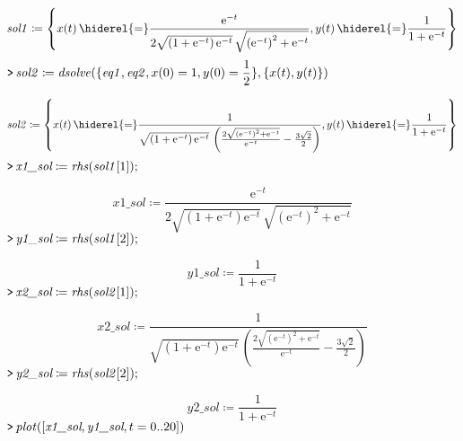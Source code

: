 \documentclass{article}
\begin{document}
\begin{dmath}\label{(14)}
\mathit{sol1} \coloneqq \left\{x \! \left(t \right) \hiderel{=} \frac{{\mathrm e}^{-t}}{2 \sqrt{\left(1+{\mathrm e}^{-t}\right) {\mathrm e}^{-t}}\, \sqrt{\left({\mathrm e}^{-t}\right)^{2}+{\mathrm e}^{-t}}},y \! \left(t \right) \hiderel{=} \frac{1}{1+{\mathrm e}^{-t}}\right\}
\end{dmath}
\mapleinput
{$ \displaystyle \texttt{>\,} \mathit{sol2} \coloneqq \mathit{dsolve} (\{\mathit{eq1} ,\mathit{eq2} ,x (0)=1,y (0)=\frac{1}{2}\},\{x (t),y (t)\}) $}

\begin{dmath}\label{(15)}
\mathit{sol2} \coloneqq \left\{x \! \left(t \right) \hiderel{=} \frac{1}{\sqrt{\left(1+{\mathrm e}^{-t}\right) {\mathrm e}^{-t}}\, \left(\frac{2 \sqrt{\left({\mathrm e}^{-t}\right)^{2}+{\mathrm e}^{-t}}}{{\mathrm e}^{-t}}-\frac{3 \sqrt{2}}{2}\right)},y \! \left(t \right) \hiderel{=} \frac{1}{1+{\mathrm e}^{-t}}\right\}
\end{dmath}
\mapleinput
{$ \displaystyle \texttt{>\,} \textit{x1\_sol} \coloneqq \mathit{rhs} (\mathit{sol1} [1]); $}

\begin{dmath}\label{(16)}
\textit{x1\_sol} \coloneqq \frac{{\mathrm e}^{-t}}{2 \sqrt{\left(1+{\mathrm e}^{-t}\right) {\mathrm e}^{-t}}\, \sqrt{\left({\mathrm e}^{-t}\right)^{2}+{\mathrm e}^{-t}}}
\end{dmath}
\mapleinput
{$ \displaystyle \texttt{>\,} \textit{y1\_sol} \coloneqq \mathit{rhs} (\mathit{sol1} [2]); $}

\begin{dmath}\label{(17)}
\textit{y1\_sol} \coloneqq \frac{1}{1+{\mathrm e}^{-t}}
\end{dmath}
\mapleinput
{$ \displaystyle \texttt{>\,} \textit{x2\_sol} \coloneqq \mathit{rhs} (\mathit{sol2} [1]); $}

\begin{dmath}\label{(18)}
\textit{x2\_sol} \coloneqq \frac{1}{\sqrt{\left(1+{\mathrm e}^{-t}\right) {\mathrm e}^{-t}}\, \left(\frac{2 \sqrt{\left({\mathrm e}^{-t}\right)^{2}+{\mathrm e}^{-t}}}{{\mathrm e}^{-t}}-\frac{3 \sqrt{2}}{2}\right)}
\end{dmath}
\mapleinput
{$ \displaystyle \texttt{>\,} \textit{y2\_sol} \coloneqq \mathit{rhs} (\mathit{sol2} [2]); $}

\begin{dmath}\label{(19)}
\textit{y2\_sol} \coloneqq \frac{1}{1+{\mathrm e}^{-t}}
\end{dmath}
\mapleinput
{$ \displaystyle \texttt{>\,} \mathit{plot} ([\textit{x1\_sol} ,\textit{y1\_sol} ,t =0..20]) $}
\end{document}
